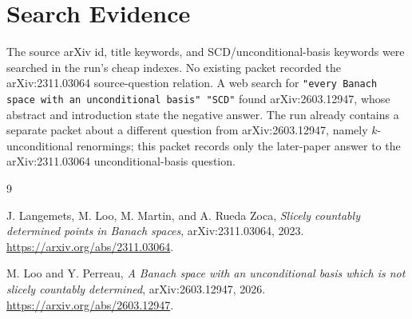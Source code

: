 \documentclass[11pt]{article}
\begin{document}
\section*{Search Evidence}

The source arXiv id, title keywords, and SCD/unconditional-basis keywords were
searched in the run's cheap indexes.  No existing packet recorded the
arXiv:2311.03064 source-question relation.  A web search for
\texttt{"every Banach space with an unconditional basis" "SCD"} found
arXiv:2603.12947, whose abstract and introduction state the negative answer.
The run already contains a separate packet about a different question from
arXiv:2603.12947, namely \(k\)-unconditional renormings; this packet records
only the later-paper answer to the arXiv:2311.03064 unconditional-basis
question.

\begin{thebibliography}{9}

J. Langemets, M. Loo, M. Martin, and A. Rueda Zoca,
\emph{Slicely countably determined points in Banach spaces},
arXiv:2311.03064, 2023.
\url{https://arxiv.org/abs/2311.03064}.

M. Loo and Y. Perreau,
\emph{A Banach space with an unconditional basis which is not slicely countably determined},
arXiv:2603.12947, 2026.
\url{https://arxiv.org/abs/2603.12947}.

\end{thebibliography}
\end{document}

